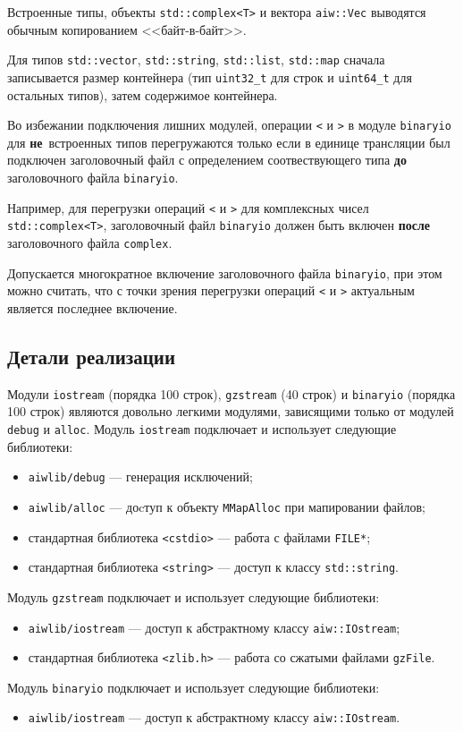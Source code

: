 Встроенные типы, объекты \verb'std::complex<T>' и вектора \verb'aiw::Vec' выводятся обычным копированием <<байт-в-байт>>.

Для типов \verb'std::vector', \verb'std::string', \verb'std::list', \verb'std::map' сначала записывается размер контейнера
(тип \verb'uint32_t' для строк и \verb'uint64_t' для остальных типов), затем содержимое контейнера.

Во избежании подключения лишних модулей, операции \verb'<' и \verb'>' в модуле \verb'binaryio'
для {\bf не}\ встроенных типов перегружаются только если в единице трансляции был подключен
заголовочный файл с определением соотвествующего типа {\bf до} заголовочного файла \verb'binaryio'.

Например, для перегрузки операций \verb'<' и \verb'>' для комплексных чисел \verb'std::complex<T>',
заголовочный файл \verb'binaryio' должен быть включен {\bf после} заголовочного файла \verb'complex'.

Допускается многократное включение заголовочного файла \verb'binaryio', при этом можно считать, что с точки
зрения перегрузки операций \verb'<' и \verb'>' актуальным является
последнее включение.

\subsection{Детали реализации}
Модули \verb'iostream' (порядка 100 строк), \verb'gzstream' (40 строк) и \verb'binaryio' (порядка 100 строк)
являются довольно легкими модулями, зависящими только от модулей \verb'debug' и \verb'alloc'.
Модуль \verb'iostream' подключает и использует следующие библиотеки:
\begin{itemize}
\item \verb'aiwlib/debug' --- генерация исключений;
\item \verb'aiwlib/alloc' --- доcтуп к объекту \verb'MMapAlloc' при мапировании файлов;
\item стандартная библиотека \verb'<cstdio>' --- работа с файлами \verb'FILE*';
\item стандартная библиотека \verb'<string>' --- доступ к классу \verb'std::string'.
\end{itemize}
Модуль \verb'gzstream' подключает и использует следующие библиотеки:
\begin{itemize}
\item \verb'aiwlib/iostream' --- доступ к абстрактному классу \verb'aiw::IOstream';
\item стандартная библиотека \verb'<zlib.h>' --- работа со сжатыми файлами \verb'gzFile'.
\end{itemize}
Модуль \verb'binaryio' подключает и использует следующие библиотеки:
\begin{itemize}
\item \verb'aiwlib/iostream' --- доступ к абстрактному классу \verb'aiw::IOstream'.
\end{itemize}
